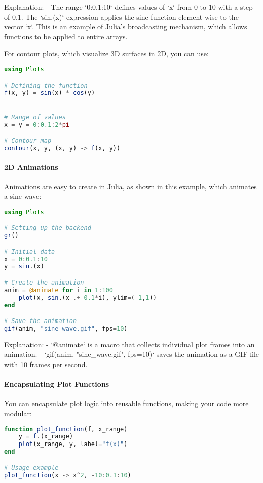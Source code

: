 Explanation:
- The range `0:0.1:10` defines values of `x` from 0 to 10 with a step of 0.1. The `sin.(x)` expression applies the sine function element-wise to the vector `x`. This is an example of Julia's broadcasting mechanism, which allows functions to be applied to entire arrays.

For contour plots, which visualize 3D surfaces in 2D, you can use:

\begin{lstlisting}[language=Julia]
using Plots

# Defining the function
f(x, y) = sin(x) * cos(y)


# Range of values
x = y = 0:0.1:2*pi

# Contour map
contour(x, y, (x, y) -> f(x, y))
\end{lstlisting}

\paragraph{2D Animations}
Animations are easy to create in Julia, as shown in this example, which animates a sine wave:

\begin{lstlisting}[language=Julia]
using Plots

# Setting up the backend
gr()

# Initial data
x = 0:0.1:10
y = sin.(x)

# Create the animation
anim = @animate for i in 1:100
    plot(x, sin.(x .+ 0.1*i), ylim=(-1,1))
end

# Save the animation
gif(anim, "sine_wave.gif", fps=10)
\end{lstlisting}

Explanation:
- `@animate` is a macro that collects individual plot frames into an animation.
- `gif(anim, "sine\_wave.gif", fps=10)` saves the animation as a GIF file with 10 frames per second.

\paragraph{Encapsulating Plot Functions}
You can encapsulate plot logic into reusable functions, making your code more modular:

\begin{lstlisting}[language=Julia]
function plot_function(f, x_range)
    y = f.(x_range)
    plot(x_range, y, label="f(x)")
end

# Usage example
plot_function(x -> x^2, -10:0.1:10)
\end{lstlisting}


